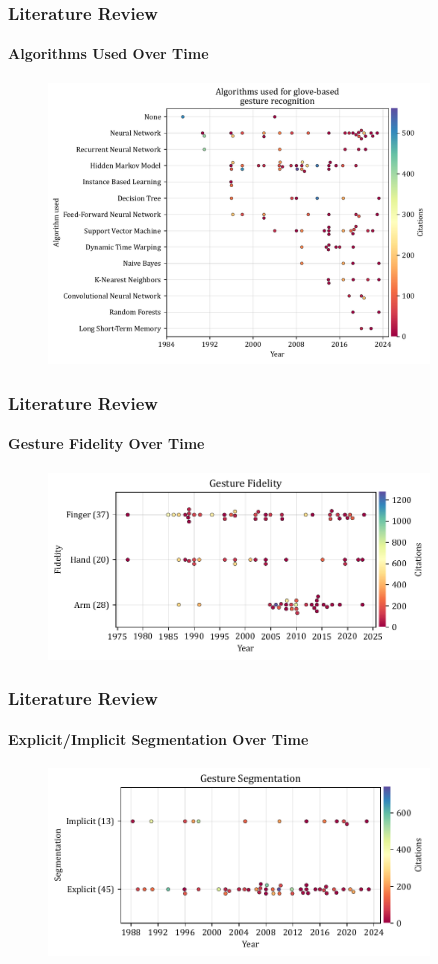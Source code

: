 \documentclass[xcolor={svgnames,table},10pt,fleqn]{beamer}
\begin{document}
\begin{frame}
    \frametitle{Literature Review}
    \framesubtitle{Algorithms Used Over Time}
    \begin{figure}
        \includegraphics[width=0.9\textwidth]{imgs/03_models_glove_based.pdf}
    \end{figure}
\end{frame}

\begin{frame}
    \frametitle{Literature Review}
    \framesubtitle{Gesture Fidelity Over Time}
    \begin{figure}
        \includegraphics[width=0.9\textwidth]{imgs/03_fidelity_for_gloves.pdf}
    \end{figure}
\end{frame}

\begin{frame}
    \frametitle{Literature Review}
    \framesubtitle{Explicit/Implicit Segmentation Over Time}
    \begin{figure}
        \includegraphics[width=0.9\textwidth]{imgs/03_segmentation_for_gloves.pdf}
    \end{figure}
\end{frame}
\end{document}
